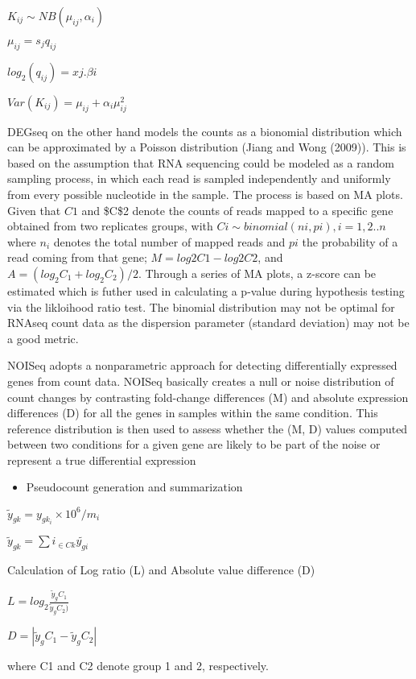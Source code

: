 \documentclass[]{article}
\providecommand{\tightlist}{%
  \setlength{\itemsep}{0pt}\setlength{\parskip}{0pt}}
\begin{document}
\(K_{ij}∼NB(μ_{ij},α_{i})\)

\(μ_{ij}=s_{j}q_{ij}\)

\(log_{2}(q_{ij})=x{j}.β{i}\)

\(Var(K_{ij})=μ_{ij}+α_iμ^2_{ij}\)

DEGseq on the other hand models the counts as a bionomial distribution
which can be approximated by a Poisson distribution (Jiang and Wong
(2009)). This is based on the assumption that RNA sequencing could be
modeled as a random sampling process, in which each read is sampled
independently and uniformly from every possible nucleotide in the
sample. The process is based on MA plots. Given that \(C1\) and \$C\$2
denote the counts of reads mapped to a specific gene obtained from two
replicates groups, with \(Ci ∼ binomial (ni, pi), i = 1, 2..n\) where
\(n_i\) denotes the total number of mapped reads and \(pi\) the
probability of a read coming from that gene; \(M = log2C1- log2C2\), and
\(A = (log_2C_1 + log_2C_2)/2\). Through a series of MA plots, a z-score
can be estimated which is futher used in calculating a p-value during
hypothesis testing via the likloihood ratio test. The binomial
distribution may not be optimal for RNAseq count data as the dispersion
parameter (standard deviation) may not be a good metric.

NOISeq adopts a nonparametric approach for detecting differentially
expressed genes from count data. NOISeq basically creates a null or
noise distribution of count changes by contrasting fold-change
differences (M) and absolute expression differences (D) for all the
genes in samples within the same condition. This reference distribution
is then used to assess whether the (M, D) values computed between two
conditions for a given gene are likely to be part of the noise or
represent a true differential expression

\begin{itemize}
\tightlist
\item
  Pseudocount generation and summarization
\end{itemize}

\(\tilde{y}_{gk}=y_{gk_i}×10^6/m_i\)

\(\tilde{y}_{gk}=∑i_{∈Ck}\tilde{y_{gi}}\)

Calculation of Log ratio (L) and Absolute value difference (D)

\(L = log_2 \frac {\tilde{y}_gC_1}{\tilde{y}_gC_2)}\)

\(D=|\tilde{y}_gC_1−\tilde{y}_gC_2|\)

where C1 and C2 denote group 1 and 2, respectively.
\end{document}
